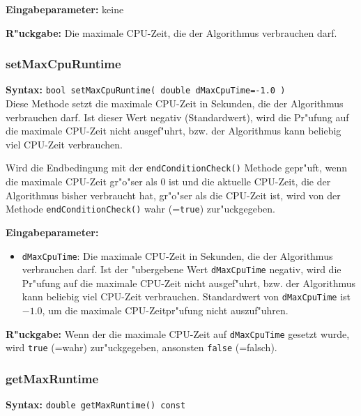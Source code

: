 \bigskip\noindent
\textbf{Eingabeparameter:} keine

\bigskip\noindent
\textbf{R"uckgabe:} Die maximale CPU-Zeit, die der Algorithmus verbrauchen darf.


\subsubsection{setMaxCpuRuntime}

\textbf{Syntax:} \verb|bool setMaxCpuRuntime( double dMaxCpuTime=-1.0 )| \\


Diese Methode setzt die maximale CPU-Zeit in Sekunden, die der Algorithmus verbrauchen darf. Ist dieser Wert negativ (Standardwert), wird die Pr"ufung auf die maximale CPU-Zeit nicht ausgef"uhrt, bzw. der Algorithmus kann beliebig viel CPU-Zeit verbrauchen.

Wird die Endbedingung mit der \verb|endConditionCheck()| Methode gepr"uft, wenn die maximale CPU-Zeit gr"o"ser als $0$ ist und die aktuelle CPU-Zeit, die der Algorithmus bisher verbraucht hat, gr"o"ser als die CPU-Zeit ist, wird von der Methode \verb|endConditionCheck()| wahr (=\verb|true|) zur"uckgegeben.

\bigskip\noindent
\textbf{Eingabeparameter:}
\begin{itemize}
 \item \verb|dMaxCpuTime|: Die maximale CPU-Zeit in Sekunden, die der Algorithmus verbrauchen darf. Ist der "ubergebene Wert \verb|dMaxCpuTime| negativ, wird die Pr"ufung auf die maximale CPU-Zeit nicht ausgef"uhrt, bzw. der Algorithmus kann beliebig viel CPU-Zeit verbrauchen. Standardwert von \verb|dMaxCpuTime| ist $-1.0$, um die maximale CPU-Zeitpr"ufung nicht auszuf"uhren.
\end{itemize}

\bigskip\noindent
\textbf{R"uckgabe:} Wenn der die maximale CPU-Zeit auf \verb|dMaxCpuTime| gesetzt wurde, wird \verb|true| (=wahr) zur"uckgegeben, ansonsten \verb|false| (=falsch).


\subsubsection{getMaxRuntime}

\textbf{Syntax:} \verb|double getMaxRuntime() const| \\

